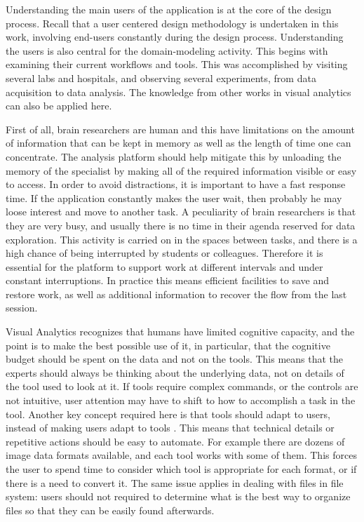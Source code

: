 Understanding the main users of the application is at the core of the design process. Recall that a user centered design methodology is undertaken in this work, involving end-users constantly during the design process. Understanding the users is also central for the domain-modeling activity. This begins with examining their current workflows and tools. This was accomplished by visiting several labs and hospitals, and observing several experiments, from data acquisition to data analysis. The knowledge from other works in visual analytics can also be applied here. 

First of all, brain researchers are human and this have limitations on the amount of information that can be kept in memory as well as the length of time one can concentrate. The analysis platform should help mitigate this by unloading the memory of the specialist by making all of the required information visible or easy to access. In order to avoid distractions, it is important to have a fast response time. If the application constantly makes the user wait, then probably he may loose interest and move to another task. A peculiarity of brain researchers is that they are very busy, and usually there is no time in their agenda reserved for data exploration. This activity is carried on in the spaces between tasks, and there is a high chance of being interrupted by students or colleagues. Therefore it is essential for the platform to support work at different intervals and under constant interruptions. In practice this means efficient facilities to save and restore work, as well as additional information to recover the flow from the last session. 

Visual Analytics recognizes that humans have limited cognitive capacity, and the point is to make the best possible use of it, in particular, that the cognitive budget should be spent on the data and not on the tools. This means that the experts should always be thinking about the underlying data, not on details of the tool used to look at it. If tools require complex commands, or the controls are not intuitive, user attention may have to shift to how to accomplish a task in the tool. Another key concept required here is that tools should adapt to users, instead of making users adapt to tools \autocite{norman_design_2002}. This means that technical details or repetitive actions should be easy to automate. For example there are dozens of image data formats available, and each tool works with some of them. This forces the user to spend time to consider which tool is appropriate for each format, or if there is a need to convert it. The same issue applies in dealing with files in file system: users should not required to determine what is the best way to organize files so that they can be easily found afterwards. 

